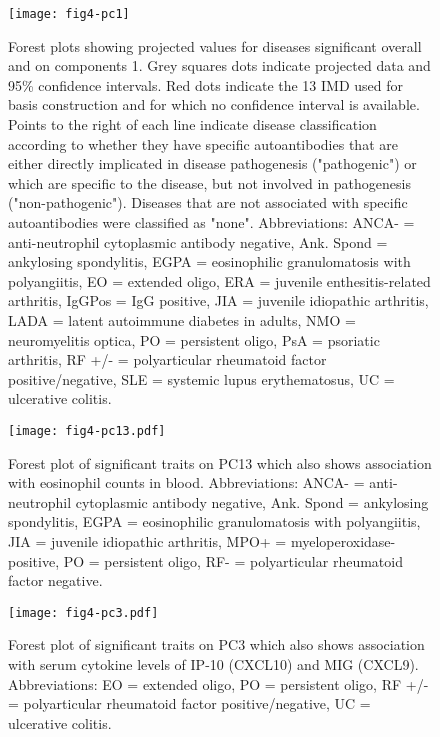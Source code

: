 \documentclass[11pt]{article}
\begin{document}
\begin{figure}
  \centering
  \texttt{[image: fig4-pc1]}
  \caption{Forest plots showing projected values for diseases significant overall and on components 1. Grey squares dots indicate projected data and 95\% confidence intervals. Red dots indicate the 13 IMD used for basis construction and for which no confidence interval is available. Points to the right of each line indicate disease classification according to whether  they have specific autoantibodies that are either directly implicated in disease pathogenesis ("pathogenic") or which are specific to the disease, but not involved in pathogenesis ("non-pathogenic"). Diseases that are not associated with specific autoantibodies were classified as "none". Abbreviations: ANCA- = anti-neutrophil cytoplasmic antibody negative, Ank. Spond = ankylosing spondylitis, EGPA = eosinophilic granulomatosis with polyangiitis, EO = extended oligo, ERA = juvenile enthesitis-related arthritis, IgGPos = IgG positive, JIA = juvenile idiopathic arthritis, LADA = latent autoimmune diabetes in adults, NMO = neuromyelitis optica, PO = persistent oligo, PsA = psoriatic arthritis, RF +/- = polyarticular rheumatoid factor positive/negative, SLE = systemic lupus erythematosus, UC = ulcerative colitis.}
  \label{fig:4}
\end{figure}


\begin{figure}
  \centering
  \texttt{[image: fig4-pc13.pdf]}
  \caption{Forest plot of significant traits on PC13 which also shows association with eosinophil counts in blood.  Abbreviations: ANCA- = anti-neutrophil cytoplasmic antibody negative, Ank. Spond = ankylosing spondylitis, EGPA = eosinophilic granulomatosis with polyangiitis, JIA = juvenile idiopathic arthritis, MPO+ = myeloperoxidase-positive, PO = persistent oligo, RF- = polyarticular rheumatoid factor negative.}
  \label{fig:4}
\end{figure}

\begin{figure}
  \centering
  \texttt{[image: fig4-pc3.pdf]}
  \caption{Forest plot of significant traits on PC3 which also shows association with serum cytokine levels of IP-10 (CXCL10) and MIG (CXCL9). Abbreviations: EO = extended oligo, PO = persistent oligo,  RF +/- = polyarticular rheumatoid factor positive/negative, UC = ulcerative colitis.}
  \label{fig:4}
\end{figure}
\end{document}

